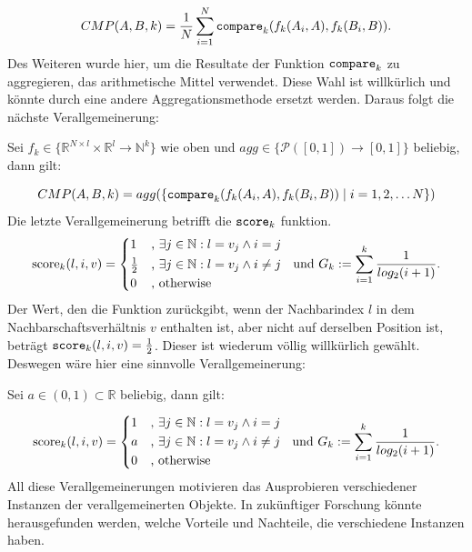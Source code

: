 \documentclass[12pt,letterpaper,ngerman]{article}
\begin{document}
\[
  CMP(A,B,k) = 
  \frac{1}{N}\sum_{i = 1}^{N} 
  \verb|compare|_k(f_k(A_i,A),f_k(B_i, B)).
\]
Des Weiteren wurde hier, um die Resultate der Funktion 
$\verb|compare|_k$ zu aggregieren, das arithmetische Mittel
verwendet. Diese Wahl ist willkürlich und könnte durch eine 
andere Aggregationsmethode ersetzt werden. Daraus
folgt die nächste Verallgemeinerung:
\begin{center}
  Sei $f_k \in \{\mathbb{R}^{N\times l}
  \times \mathbb{R}^l \to \mathbb{N}^k\}$ wie oben und 
  $agg \in \{\mathcal{P}([0,1]) \to [0,1]\}$ beliebig, 
  dann gilt:
\end{center}
\[ 
  CMP(A,B,k) = 
  agg(\{\verb|compare|_k(f_k(A_i,A),f_k(B_i,B)) 
    \hspace{0.1cm}|\hspace{0.1cm} i = 1,2, \dots N\})
\]
Die letzte Verallgemeinerung betrifft die $\verb|score|_k$
funktion. 
\[
  \text{score}_k(l,i,v) = \begin{cases*} 
      1 & , $\exists j \in \mathbb{N}: l = v_j \land i = j$   \\
      \frac{1}{2} & , $\exists j \in \mathbb{N}: l = v_j \land i \neq j$\\
      0   & , \text{otherwise}
    \end{cases*}  \text{  und  }
    G_k := \sum_{i=1}^{k} \frac{1}{log_2(i+1)}.
\]
Der Wert, den die Funktion zurückgibt, wenn der Nachbarindex 
$l$ in dem Nachbarschaftsverhältnis $v$ enthalten ist,
aber nicht auf derselben Position ist,
beträgt $\verb|score|_k(l,i,v) = \frac{1}{2}$. 
Dieser ist wiederum völlig willkürlich gewählt.
Deswegen wäre hier eine sinnvolle Verallgemeinerung:
\begin{center}
  Sei $a \in (0,1) \subset \mathbb{R}$ beliebig, dann gilt:
\end{center}
\[
  \text{score}_k(l,i,v) = \begin{cases*} 
      1 & , $\exists j \in \mathbb{N}: l = v_j \land i = j$   \\
      a & , $\exists j \in \mathbb{N}: l = v_j \land i \neq j$\\
      0 & , \text{otherwise}
    \end{cases*}  \text{  und  }
    G_k := \sum_{i=1}^{k} \frac{1}{log_2(i+1)}.
\]
All diese Verallgemeinerungen motivieren das
Ausprobieren verschiedener Instanzen der verallgemeinerten 
Objekte. In zukünftiger Forschung könnte herausgefunden  
werden, welche Vorteile und Nachteile, die verschiedene 
Instanzen haben.\\\\
\end{document}
